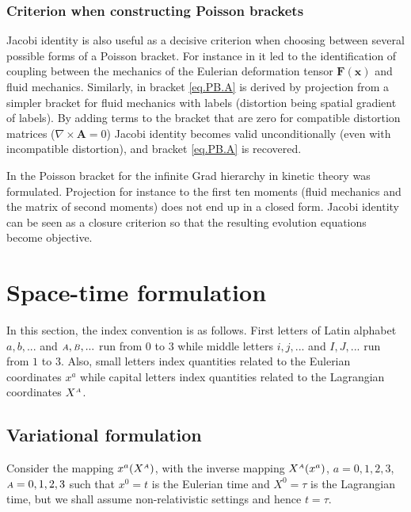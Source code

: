 \documentclass[
10pt, %
a4paper, %
oneside, %
headinclude,footinclude, %
BCOR5mm, %
]{scrartcl}
\newcommand{\xx}{\mathbf{x}}
\newcommand{\FF}{\mathbf{F}}
\renewcommand{\AA}{\mathbf{A}}
\newcommand{\IP}[1]{{\color{Red}IP:\ \ #1}}
\newcommand{\sA}{\mathsmaller A}
\newcommand{\sB}{\mathsmaller B}
\begin{document}
\subsubsection{Criterion when constructing Poisson brackets}
Jacobi identity is also useful as a decisive criterion when choosing between several possible forms of a Poisson bracket. For instance in \cite{Markus2009} it led to the identification of coupling between the mechanics of the Eulerian deformation tensor $\FF(\xx)$ and fluid mechanics. Similarly, in \cite{SHTC-GENERIC}  bracket \eqref{eq.PB.A} is derived by projection from a simpler bracket for fluid mechanics with labels (distortion being spatial gradient of labels). By adding terms to the bracket that are zero for compatible distortion matrices ($\nabla\times\AA=0$) Jacobi identity becomes valid unconditionally (even with incompatible distortion), and bracket \eqref{eq.PB.A} is recovered.

In \cite{Miroslav-Grad} the Poisson bracket for the infinite Grad hierarchy in kinetic theory was formulated. Projection for instance to the first ten moments (fluid mechanics and the matrix of second moments) does not end up in a closed form. Jacobi identity can be seen as a closure criterion so that the resulting evolution equations become objective.

\section{Space-time formulation}\label{sec.Lagr.mech}

In this section, the index convention is as follows. First letters of Latin alphabet $ a,b,... 
$ and $ 
\sA,\sB,... $ run from $ 0 $ to $ 3 $  while middle letters $ i,j,... $ and $ I,J,... $ run from $ 
1 $ to $ 3 $. Also, small letters index quantities related to the Eulerian coordinates $ x^a $ 
while capital letters index quantities related to the Lagrangian coordinates $ X^\sA $.

\subsection{Variational formulation}\label{sec.variation}

Consider the mapping $x^a(X^\sA)$, with the inverse mapping $ X^\sA(x^a) $,  $a=0,1,2,3$, 
$\sA=0,1,2,3$ such that $x^0=t$ is the Eulerian 
time and $X^0 = \tau$ is the Lagrangian time, but we shall assume non-relativistic settings and 
hence $t=\tau$. 
\end{document}
